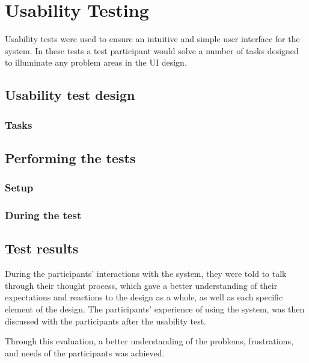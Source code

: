 \section{Usability Testing}\label{sc:UsabilityTesting}
Usability tests were used to ensure an intuitive and simple user interface for the system. In these tests a test participant would solve a number of tasks designed to illuminate any problem areas in the UI design. 

\subsection{Usability test design}
\subsubsection{Tasks}

\subsection{Performing the tests}
\subsubsection{Setup}
\subsubsection{During the test}

\subsection{Test results}


During the participants' interactions with the system, they were told to talk through their thought process, which gave a better understanding of their expectations and reactions to the design as a whole, as well as each specific element of the design. The participants' experience of using the system, was then discussed with the participants after the usability test. 
\par
Through this evaluation, a better understanding of the problems, frustrations, and needs of the participants was achieved.
\par
{}
